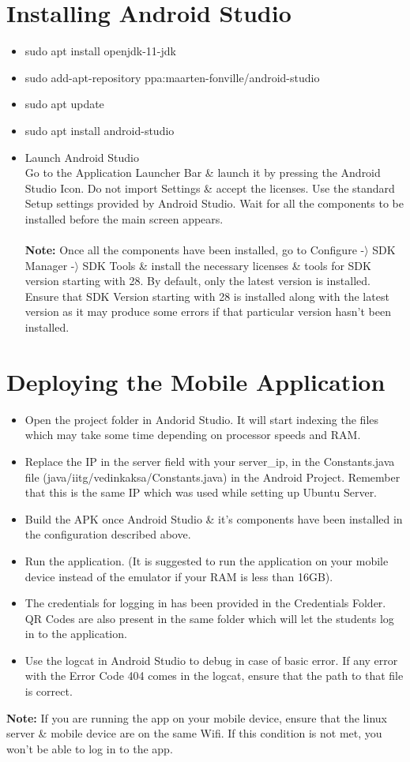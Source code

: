 \documentclass[10pt]{report}
\begin{document}
\section{Installing Android Studio}
\begin{itemize}
\item{sudo apt install openjdk-11-jdk}
\item{sudo add-apt-repository ppa:maarten-fonville/android-studio}
\item{sudo apt update}
\item{sudo apt install android-studio}
\item{Launch Android Studio} \\ 
Go to the Application Launcher Bar \& launch it by pressing the Android Studio Icon. Do not import Settings \& accept the licenses. Use the standard Setup settings provided by Android Studio. Wait for all the components to be installed before the main screen appears. \\ \\ 
\textbf{Note:} Once all the components have been installed, go to Configure -$\rangle$ SDK Manager -$\rangle$ SDK Tools \& install the necessary licenses \& tools for SDK version starting with 28. By default, only the latest version is installed. Ensure that SDK Version starting with 28 is installed along with the latest version as it may produce some errors if that particular version hasn’t been installed.
\end{itemize}
\newpage
\section{Deploying the Mobile Application}
\begin{itemize}
\item{Open the project folder in Andorid Studio. It will start indexing the files which may take some time depending on processor speeds and RAM.}
\item{Replace the IP in the server field with your server\_ip, in the Constants.java file (java/iitg/vedinkaksa/Constants.java) in the Android Project. Remember that this is the same IP which was used while setting up Ubuntu Server.}
\item{Build the APK once Android Studio \& it’s components have been installed in the configuration described above.}
\item{Run the application. (It is suggested to run the application on your mobile device instead of the emulator if your RAM is less than 16GB).}
\item{The credentials for logging in has been provided in the Credentials Folder. QR Codes are also present in the same folder which will let the students log in to the application.}
\item{Use the logcat in Android Studio to debug in case of basic error. If any error with the Error Code 404 comes in the logcat, ensure that the path to that file is correct.}
\end{itemize}
\textbf{Note:} If you are running the app on your mobile device, ensure that the linux server \& mobile device are on the same Wifi. If this condition is not met, you won’t be able to log in to the app.
\newpage
\end{document}
